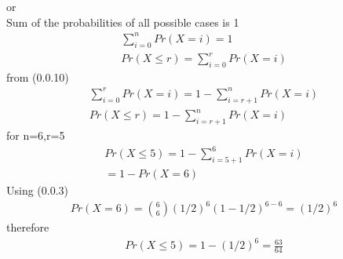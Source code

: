 \documentclass[journal,12pt,twocolumn]{IEEEtran}
\begin{document}
\begin{enumerate}
    or\\
       Sum of the probabilities of all possible cases is 1\\
    \begin{align}
        \sum^{n}_{i=0}Pr(X=i)=1\\
        Pr(X\leq r)=\sum^{r}_{i=0}Pr(X=i)
    \end{align}
        from (0.0.10)\\
    \begin{align}
        \sum^{r}_{i=0}Pr(X=i)=1-\sum^{n}_{i=r+1}Pr(X=i)\\
        Pr(X\leq r)=1-\sum^{n}_{i=r+1}Pr(X=i)
    \end{align}
    for n=6,r=5
    \begin{align}
        Pr(X\leq5)=1-\sum^{6}_{i=5+1}Pr(X=i)\\
        =1-Pr(X=6)
    \end{align}
    Using (0.0.3)
    \begin{align}
       Pr(X=6)=\binom{6}{6} (1/2)^{6}(1-1/2)^{6-6}=(1/2)^6
    \end{align}
    therefore
    \begin{align}
      Pr(X\leq5)=1-(1/2)^6=\frac{63}{64}
    \end{align}
\end{enumerate}
\end{document}
